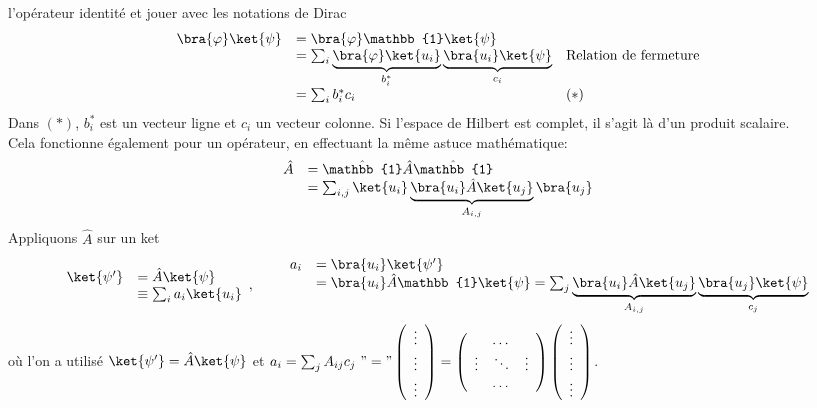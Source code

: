 l'opérateur identité et jouer avec les notations de Dirac
\begin{equation}
\begin{array}{lll}
\bra{\varphi}\ket{\psi} &= \bra{\varphi}\mathbb{1}\ket{\psi}\\
&= \sum_i \underbrace{\bra{\varphi}\ket{u_i}}_{b_i^*}\underbrace{\bra{u_i}\ket{\psi}}_{c_i} &
\text{Relation de fermeture}\\
&= \sum_i b_i^*c_i & (*)
\end{array}
\end{equation}
Dans $(*)$, $b_i^*$ est un vecteur ligne et $c_i$ un vecteur colonne. Si l'espace de Hilbert 
est complet, il s'agit là d'un produit scalaire.\\
Cela fonctionne également pour un opérateur, en effectuant la même astuce mathématique:
\begin{equation}
\begin{array}{ll}
\hat{A} &= \hat{\mathbb{1}}\hat{A}\hat{\mathbb{1}}\\
&=\sum_{i,j} \ket{u_i}\underbrace{\bra{u_i}\hat{A}\ket{u_j}}_{A_{i,j}}\bra{u_j}
\end{array}
\end{equation}
Appliquons $\hat{A}$ sur un ket
\begin{equation}
\begin{array}{ll}
\ket{\psi'} &= \hat{A}\ket{\psi}\\
&\equiv \sum_i a_i\ket{u_i}
\end{array},\qquad \begin{array}{ll}
a_i &= \bra{u_i}\ket{\psi'}\\
&=\bra{u_i}\hat{A}\mathbb{1}\ket{\psi} = \sum_j \underbrace{\bra{u_i}\hat{A}\ket{u_j}}_{A_{i,j}}
\underbrace{\bra{u_j}\ket{\psi}}_{c_j}
\end{array}
\end{equation}
où l'on a utilisé $\ket{\psi'} = \hat{A}\ket{\psi}$ et $a_i = \sum_jA_{ij}c_j\  "=" 
\left(\begin{array}{c}
\vdots\\
\vdots\\
\vdots
\end{array}\right) = \left(\begin{array}{ccc}
  & \dots &  \\
\vdots &\ddots &\vdots\\
  & \dots &  
\end{array}\right)\left(\begin{array}{c}
\vdots\\
\vdots\\
\vdots\\
\end{array}\right)$.


